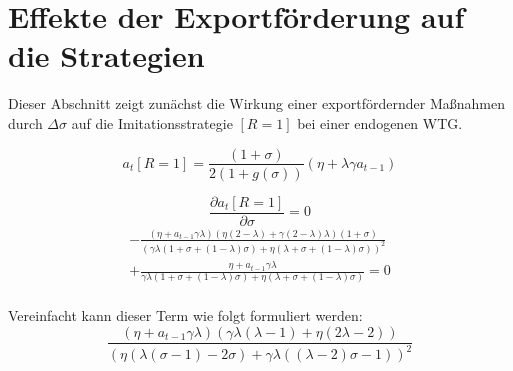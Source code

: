 \section[Effekte der Exportförderung auf die Strategien]{Effekte der Exportförderung auf die Strategien }\label{math:Effekte}
Dieser Abschnitt zeigt zunächst die Wirkung einer exportfördernder Ma{\ss}nahmen durch $\Delta\sigma$ auf die Imitationsstrategie $[R=1]$ bei einer endogenen WTG.

\begin{equation}
a_t [R=1]=\frac{(1+\sigma)}{2(1+g(\sigma))}(\eta+\lambda\gamma a_{t-1})
\end{equation}

\begin{equation}
\boxed{
\frac{\partial a_t[R=1]}{\partial\sigma}=0}
\end{equation}
\begin{equation}
\begin{split}-\frac{(\eta+a_{t-1}\gamma\lambda)(\eta(2-\lambda)+\gamma(2-\lambda)\lambda)(1+\sigma)}{(\gamma\lambda(1+\sigma+(1-\lambda)\sigma)+\eta(\lambda+\sigma+(1-\lambda)\sigma))^2}\\
+\frac{\eta+a_{t-1}\gamma\lambda}{\gamma\lambda(1+\sigma+(1-\lambda)\sigma)+\eta(\lambda+\sigma+(1-\lambda)\sigma)}=0
\end{split}
\end{equation}
\\
Vereinfacht kann dieser Term wie folgt formuliert werden:
\begin{equation}
\frac{(\eta+a_{t-1}\gamma\lambda)(\gamma\lambda(\lambda-1)+\eta(2\lambda-2))}{(\eta(\lambda(\sigma-1)-2\sigma)+\gamma\lambda((\lambda-2)\sigma-1))^2}
\end{equation}
\\

